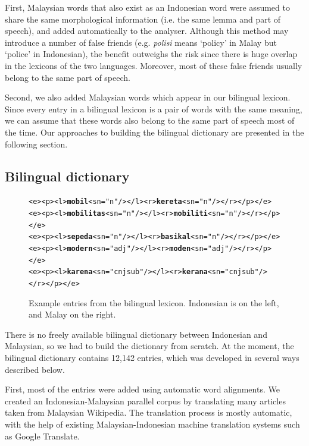 \documentclass[10pt,a5paper,twoside]{article}
\begin{document}
First, Malaysian words that also exist as an Indonesian word were assumed to share the same morphological information (i.e. the same lemma and part of speech), and added automatically to the analyser. Although this method may introduce a number of false friends (e.g. \emph{polisi} means `policy' in Malay but `police' in Indonesian), the benefit outweighs the risk since there is huge overlap in the lexicons of the two languages. Moreover, most of these false friends usually belong to the same part of speech.

Second, we also added Malaysian words which appear in our bilingual lexicon. Since every entry in a bilingual lexicon is a pair of words with the same meaning, we can assume that these words also belong to the same part of speech most of the time. Our approaches to building the bilingual dictionary are presented in the following section.

\subsection{Bilingual dictionary}

\begin{figure}[htbp]
\begin{center}
\begin{small}
\begin{alltt}
<e><p><l>\textbf{mobil}<s n="n"/></l><r>\textbf{kereta}<s n="n"/></r></p></e>
<e><p><l>\textbf{mobilitas}<s n="n"/></l><r>\textbf{mobiliti}<s n="n"/></r></p></e>
<e><p><l>\textbf{sepeda}<s n="n"/></l><r>\textbf{basikal}<s n="n"/></r></p></e>
<e><p><l>\textbf{modern}<s n="adj"/></l><r>\textbf{moden}<s n="adj"/></r></p></e>
<e><p><l>\textbf{karena}<s n="cnjsub"/></l><r>\textbf{kerana}<s n="cnjsub"/></r></p></e>
\end{alltt}
\end{small}
\caption{Example entries from the bilingual lexicon. Indonesian is on the left, and Malay on the right.}
\label{fig:bidix}
\end{center}
\end{figure}

There is no freely available bilingual dictionary between Indonesian and Malaysian, so we had to build the dictionary from scratch. At the moment, the bilingual dictionary contains 12,142 entries, which was developed in several ways described below.

First, most of the entries were added using automatic word alignments. We created an Indonesian-Malaysian parallel corpus by translating many articles taken from Malaysian Wikipedia. The translation process is mostly automatic, with the help of existing Malaysian-Indonesian machine translation systems such as Google Translate.
\end{document}
